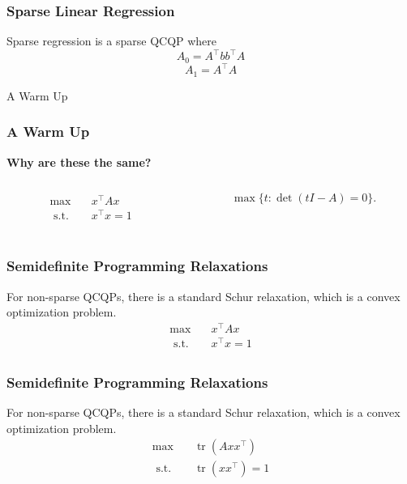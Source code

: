 \documentclass{beamer}
\DeclareMathOperator{\tr}{tr}
\newcommand{\st}{{\text{ s.t. }}}
\begin{document}
\begin{frame}
    \frametitle{Sparse Linear Regression}
    Sparse regression is a sparse QCQP where
    \[
        A_0 = A^{\intercal}bb^{\intercal}A
    \]
    \[
        A_1 = A^{\intercal}A
    \]
\end{frame}
\begin{frame}
    \centering
    \huge
    {\color{gray}A Warm Up}
\end{frame}
\begin{frame}
    \frametitle{A Warm Up}
    \textbf{Why are these the same? }
    \vspace{0.6in}
    \begin{columns}
        \begin{column}{0.48\textwidth}
            \begin{equation*}
                \begin{aligned}
                    \max\quad & x^{\intercal}Ax\\
                    \st & x^{\intercal}x = 1\\
                \end{aligned}
            \end{equation*}
        \end{column}
        \begin{column}{0.48\textwidth}
            \[
                \max \{t : \det(tI - A) = 0\}.
            \]
        \end{column}
    \end{columns}
\end{frame}
\begin{frame}
\frametitle{Semidefinite Programming Relaxations}
    For non-sparse QCQPs, there is a standard Schur relaxation, which is a convex
    optimization problem.
    \begin{equation*}
        \begin{aligned}
            \max\quad & x^{\intercal}Ax\\
            \st & x^{\intercal}x = 1\\
        \end{aligned}
    \end{equation*}
    \vspace{0.6in}
\end{frame}
\begin{frame}
\frametitle{Semidefinite Programming Relaxations}
    For non-sparse QCQPs, there is a standard Schur relaxation, which is a convex
    optimization problem.
    \begin{equation*}
        \begin{aligned}
            \max\quad & \tr(Axx^{\intercal})\\
            \st & \tr(xx^{\intercal}) = 1\\
        \end{aligned}
    \end{equation*}
    \vspace{0.6in}
\end{frame}
\end{document}
